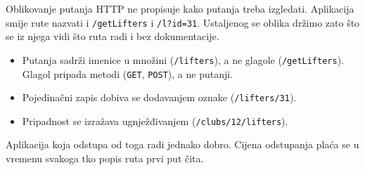 \begin{frame}{Oblikovanje putanja}
HTTP ne propisuje kako putanja treba izgledati. Aplikacija smije rute nazvati i \texttt{/getLifters} i \texttt{/l?id=31}. Ustaljenog se oblika držimo zato što se iz njega vidi što ruta radi i bez dokumentacije.

\vspace{0.5em}
\begin{konvencija}
\begin{itemize}
  \item Putanja sadrži imenice u množini (\texttt{/lifters}), a ne glagole (\texttt{/getLifters}). Glagol pripada metodi (\texttt{GET}, \texttt{POST}), a ne putanji.
  \item Pojedinačni zapis dobiva se dodavanjem oznake (\texttt{/lifters/31}).
  \item Pripadnost se izražava ugnježđivanjem (\texttt{/clubs/12/lifters}).
\end{itemize}
\end{konvencija}

\vspace{0.4em}
Aplikacija koja odstupa od toga radi jednako dobro. Cijena odstupanja plaća se u vremenu svakoga tko popis ruta prvi put čita.
\end{frame}

